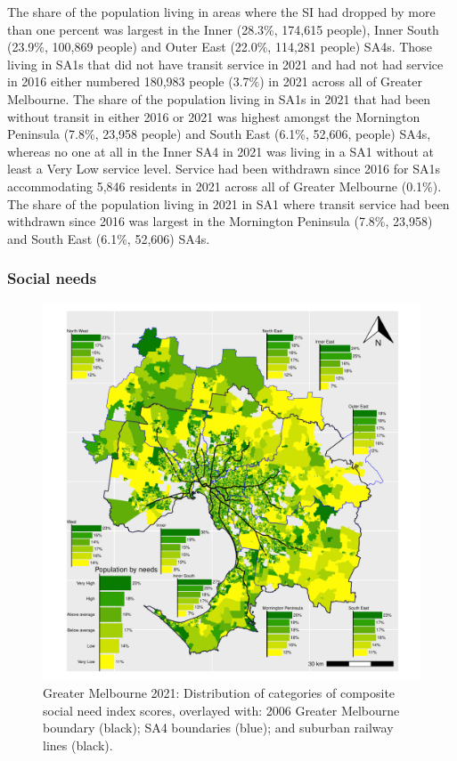 \documentclass[preprint, 3p,
authoryear]{elsarticle} %
\begin{document}
The share of the population living in areas where the SI had dropped by
more than one percent was largest in the Inner (28.3\%, 174,615 people),
Inner South (23.9\%, 100,869 people) and Outer East (22.0\%, 114,281
people) SA4s. Those living in SA1s that did not have transit service in
2021 and had not had service in 2016 either numbered 180,983 people
(3.7\%) in 2021 across all of Greater Melbourne. The share of the
population living in SA1s in 2021 that had been without transit in
either 2016 or 2021 was highest amongst the Mornington Peninsula (7.8\%,
23,958 people) and South East (6.1\%, 52,606, people) SA4s, whereas no
one at all in the Inner SA4 in 2021 was living in a SA1 without at least
a Very Low service level. Service had been withdrawn since 2016 for SA1s
accommodating 5,846 residents in 2021 across all of Greater Melbourne
(0.1\%). The share of the population living in 2021 in SA1 where transit
service had been withdrawn since 2016 was largest in the Mornington
Peninsula (7.8\%, 23,958) and South East (6.1\%, 52,606) SA4s.

\subsubsection{Social needs}\label{social-needs}

\begin{figure}
\centering
\includegraphics{ReynoldsCurrieQu2024_files/figure-latex/Greater_Melbourne_2021_social_needs-1.pdf}
\caption{Greater Melbourne 2021: Distribution of categories of composite
social need index scores, overlayed with: 2006 Greater Melbourne
boundary (black); SA4 boundaries (blue); and suburban railway lines
(black).}
\end{figure}
\end{document}
